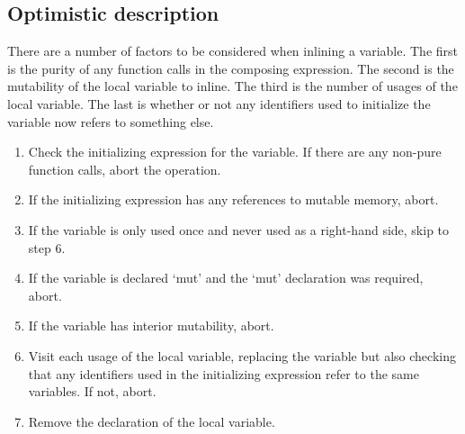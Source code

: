 \subsection{Optimistic description}
There are a number of factors to be considered when inlining a variable. The first is the purity of any function calls in the composing expression. The second is the mutability of the local variable to inline. The third is the number of usages of the local variable. The last is whether or not any identifiers used to initialize the variable now refers to something else.

\begin{enumerate} 
\item Check the initializing expression for the variable. If there are any non-pure function calls, abort the operation.
\item If the initializing expression has any references to mutable memory, abort.
\item If the variable is only used once and never used as a right-hand side, skip to step 6.
\item If the variable is declared `mut' and the `mut' declaration was required, abort.
\item If the variable has interior mutability, abort.
\item Visit each usage of the local variable, replacing the variable but also checking that any identifiers used in the initializing expression refer to the same variables. If not, abort.
\item Remove the declaration of the local variable.
\end{enumerate}

